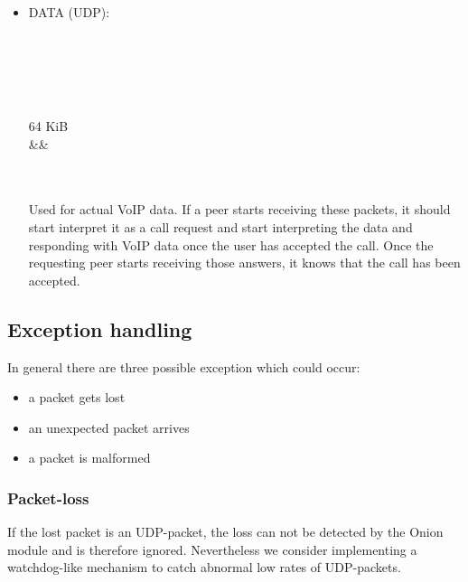 \documentclass{article}
\begin{document}
\begin{itemize}
Used for fake data if there is no active call between two peers. The packet always is of size 64 KiB. The recipient can just ignore the content.


\item DATA (UDP): \\
\begin{bytefield}[bitwidth=1.0em]{32}
	 \\
	 \\
	 \\
	\skippedwords \\
\end{bytefield}
\begin{bytefield}[bitwidth=2.2em]{16}
	\begin{rightwordgroup}{64 KiB}
	 \\
	 &&  \\
	 \\
	 \\
	\end{rightwordgroup}
\end{bytefield}

Used for actual VoIP data. If a peer starts receiving these packets, it should start interpret it as a call request and start interpreting the data and responding with VoIP data once the user has accepted the call. Once the requesting peer starts receiving  those answers, it knows that the call has been accepted.

\end{itemize}

\subsection{Exception handling}
In general there are three possible exception which could occur:
\begin{itemize}
\item a packet gets lost
\item an unexpected packet arrives
\item a packet is malformed
\end{itemize}

\label{subsec:packet_loss_exception}
\subsubsection{Packet-loss}
If the lost packet is an UDP-packet, the loss can not be detected by the Onion module and is
therefore ignored. Nevertheless we consider implementing a watchdog-like mechanism to catch
abnormal low rates of UDP-packets.
\end{document}
